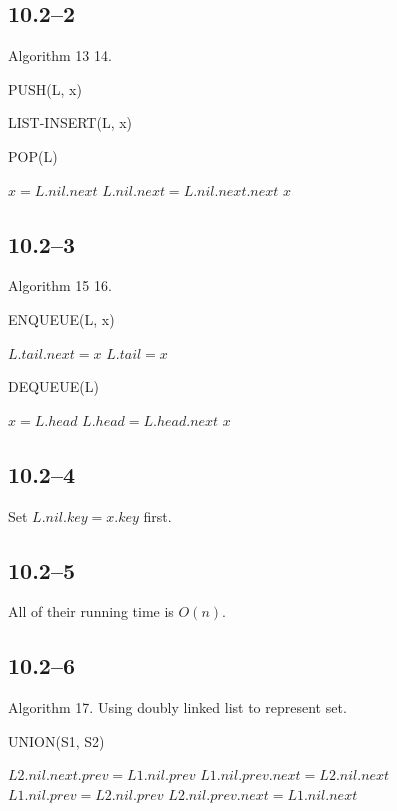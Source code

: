 \documentclass{article}
\begin{document}
\subsection*{10.2--2}
Algorithm 13 14.
\begin{algorithm}
  \caption{PUSH(L, x)}
  \begin{algorithmic}[1]
    \STATE LIST-INSERT(L, x)
  \end{algorithmic}
\end{algorithm}

\begin{algorithm}
  \caption{POP(L)}
  \begin{algorithmic}[1]
    \STATE $x = L.nil.next$
    \STATE $L.nil.next = L.nil.next.next$
    \RETURN $x$
  \end{algorithmic}
\end{algorithm}

\subsection*{10.2--3}
Algorithm 15 16.
\begin{algorithm}
  \caption{ENQUEUE(L, x)}
  \begin{algorithmic}[1]
    \STATE $L.tail.next = x$
    \STATE $L.tail = x$
  \end{algorithmic}
\end{algorithm}

\begin{algorithm}
  \caption{DEQUEUE(L)}
  \begin{algorithmic}[1]
    \STATE $x = L.head$
    \STATE $L.head = L.head.next$
    \RETURN $x$
  \end{algorithmic}
\end{algorithm}

\subsection{10.2--4}
Set $L.nil.key = x.key$ first.

\subsection{10.2--5}
All of their running time is $O(n)$.

\subsection{10.2--6}
Algorithm 17. Using doubly linked list to represent set.
\begin{algorithm}
  \caption{UNION(S1, S2)}
  \begin{algorithmic}[1]
    \STATE $L2.nil.next.prev = L1.nil.prev$
    \STATE $L1.nil.prev.next = L2.nil.next$
    \STATE $L1.nil.prev = L2.nil.prev$
    \STATE $L2.nil.prev.next = L1.nil.next$
  \end{algorithmic}
\end{algorithm}
\end{document}
